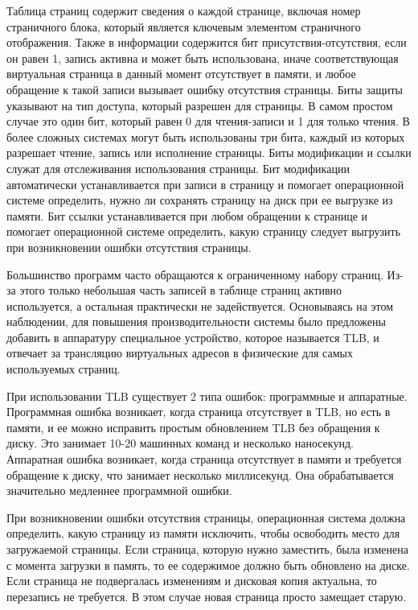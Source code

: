 Таблица страниц содержит сведения о каждой странице, включая номер страничного блока, который является ключевым элементом страничного отображения.
Также в информации содержится бит присутствия-отсутствия, если он равен 1, запись активна и может быть использована, иначе соответствующая виртуальная страница в данный момент отсутствует в памяти, и любое обращение к такой записи вызывает ошибку отсутствия страницы. 
Биты защиты указывают на тип доступа, который разрешен для страницы. 
В самом простом случае это один бит, который равен 0 для чтения-записи и 1 для только чтения.
В более сложных системах могут быть использованы три бита,
каждый из которых разрешает чтение, запись или исполнение страницы. 
Биты модификации и ссылки служат для отслеживания использования страницы.
Бит модификации автоматически устанавливается при записи в страницу и помогает операционной системе определить, нужно ли сохранять страницу на диск при ее выгрузке из памяти. 
Бит ссылки устанавливается при любом обращении к странице и помогает операционной системе определить, какую страницу следует выгрузить при возникновении ошибки отсутствия страницы.

Большинство программ часто обращаются к ограниченному
набору страниц.
Из-за этого только небольшая часть записей в таблице страниц активно используется, а остальная практически не задействуется.
Основываясь на этом наблюдении,  для повышения производительности системы было
предложены добавить в аппаратуру специальное устройство, которое называется TLB, и отвечает за трансляцию виртуальных адресов в физические для самых используемых страниц.

При использовании TLB существует 2 типа ошибок: программные и аппаратные.
Программная ошибка возникает, когда страница отсутствует в TLB, но есть в памяти, и ее можно исправить простым
обновлением TLB без обращения к диску. 
Это занимает 10-20 машинных команд и несколько наносекунд.
Аппаратная ошибка возникает, когда страница отсутствует в памяти и требуется обращение к диску, что занимает несколько миллисекунд.
Она обрабатывается значительно медленнее программной ошибки.

При возникновении ошибки отсутствия страницы, операционная система должна определить, какую страницу из памяти исключить, чтобы освободить место для загружаемой страницы.
Если страница, которую нужно заместить, была изменена с момента загрузки в память, то ее содержимое должно быть обновлено на диске.
Если страница не подвергалась изменениям и дисковая копия актуальна, то перезапись не требуется.
В этом случае новая страница просто замещает старую.

